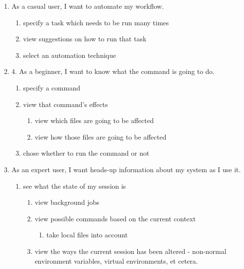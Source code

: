 \begin{enumerate}
  \item As a casual user, I want to automate my workflow.
  \begin{enumerate}
    \item specify a task which needs to be run many times
    \item view suggestions on how to run that task
    \item select an automation technique
  \end{enumerate}

  \item 4. As a beginner, I want to know what the command is going to do.
  \begin{enumerate}
    \item specify a command
    \item view that command’s effects
    \begin{enumerate}
      \item view which files are going to be affected
      \item view how those files are going to be affected
    \end{enumerate}
    \item chose whether to run the command or not
  \end{enumerate}

  \item As an expert user, I want heads-up information about my system as I use it.
  \begin{enumerate}
    \item see what the state of my session is
    \begin{enumerate}
      \item view background jobs
      \item view possible commands based on the current context
      \begin{enumerate}
        \item take local files into account
      \end{enumerate}
      \item view the ways the current session has been altered - non-normal
      environment variables, virtual environments, et cetera.
    \end{enumerate}
  \end{enumerate}
\end{enumerate}
